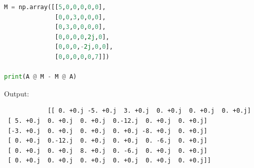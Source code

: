 \documentclass[11pt, letterpaper]{article}
\begin{document}
\begin{enumerate}
\begin{lstlisting}[language=Python]
M = np.array([[5,0,0,0,0,0],
              [0,0,3,0,0,0],
              [0,3,0,0,0,0],
              [0,0,0,0,2j,0],
              [0,0,0,-2j,0,0],
              [0,0,0,0,0,7]])

print(A @ M - M @ A)
\end{lstlisting}
		
		Output:
		\begin{lstlisting}
			[[ 0. +0.j -5. +0.j  3. +0.j  0. +0.j  0. +0.j  0. +0.j]
 [ 5. +0.j  0. +0.j  0. +0.j  0.-12.j  0. +0.j  0. +0.j]
 [-3. +0.j  0. +0.j  0. +0.j  0. +0.j -8. +0.j  0. +0.j]
 [ 0. +0.j  0.-12.j  0. +0.j  0. +0.j  0. -6.j  0. +0.j]
 [ 0. +0.j  0. +0.j  8. +0.j  0. -6.j  0. +0.j  0. +0.j]
 [ 0. +0.j  0. +0.j  0. +0.j  0. +0.j  0. +0.j  0. +0.j]]
\end{lstlisting}
		
\end{enumerate}
\end{document}
